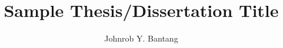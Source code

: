 \documentclass[]{nip} %
\title{Sample Thesis/Dissertation Title} %
\author{Johnrob Y. Bantang} %
\begin{document}
\maketitle %
\makePrelim %





\appendix



\end{document}
